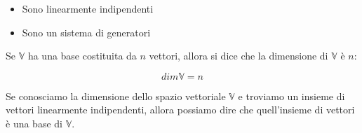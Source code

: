 \documentclass{subfiles}
\begin{document}
\begin{itemize}
    \item Sono linearmente indipendenti
    \item Sono un sistema di generatori
\end{itemize}

\noindent
Se $\mathbb{V}$ ha una base costituita da $n$ vettori, allora si dice che la dimensione di $\mathbb{V}$ è $n$:

$$
dim \mathbb{V} = n
$$

\noindent
Se conosciamo la dimensione dello spazio vettoriale $\mathbb{V}$ e troviamo un insieme di vettori linearmente indipendenti, allora possiamo dire che quell'insieme di vettori è una base di $\mathbb{V}$.
\end{document}
